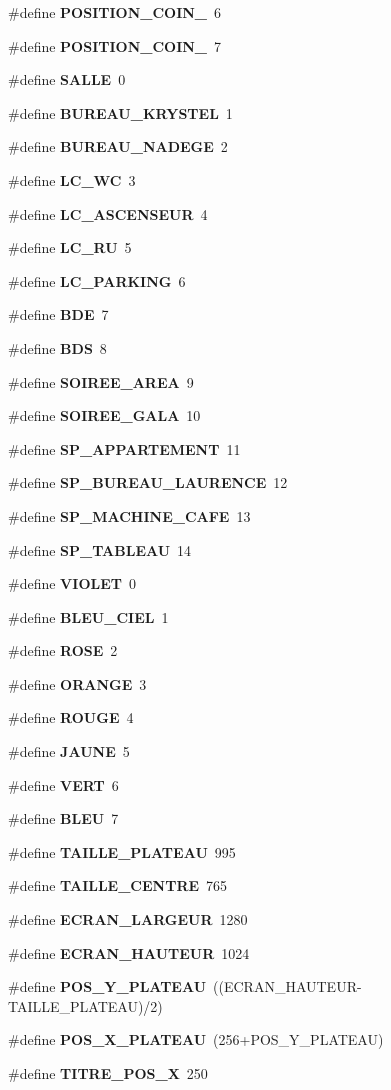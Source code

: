 \begin{CompactItemize}
\item 
\#define {\bf POSITION\_\-COIN\_}~6
\item 
\#define {\bf POSITION\_\-COIN\_}~7
\item 
\#define {\bf SALLE}~0
\item 
\#define {\bf BUREAU\_\-KRYSTEL}~1
\item 
\#define {\bf BUREAU\_\-NADEGE}~2
\item 
\#define {\bf LC\_\-WC}~3
\item 
\#define {\bf LC\_\-ASCENSEUR}~4
\item 
\#define {\bf LC\_\-RU}~5
\item 
\#define {\bf LC\_\-PARKING}~6
\item 
\#define {\bf BDE}~7
\item 
\#define {\bf BDS}~8
\item 
\#define {\bf SOIREE\_\-AREA}~9
\item 
\#define {\bf SOIREE\_\-GALA}~10
\item 
\#define {\bf SP\_\-APPARTEMENT}~11
\item 
\#define {\bf SP\_\-BUREAU\_\-LAURENCE}~12
\item 
\#define {\bf SP\_\-MACHINE\_\-CAFE}~13
\item 
\#define {\bf SP\_\-TABLEAU}~14
\item 
\#define {\bf VIOLET}~0
\item 
\#define {\bf BLEU\_\-CIEL}~1
\item 
\#define {\bf ROSE}~2
\item 
\#define {\bf ORANGE}~3
\item 
\#define {\bf ROUGE}~4
\item 
\#define {\bf JAUNE}~5
\item 
\#define {\bf VERT}~6
\item 
\#define {\bf BLEU}~7
\item 
\#define {\bf TAILLE\_\-PLATEAU}~995
\item 
\#define {\bf TAILLE\_\-CENTRE}~765
\item 
\#define {\bf ECRAN\_\-LARGEUR}~1280
\item 
\#define {\bf ECRAN\_\-HAUTEUR}~1024
\item 
\#define {\bf POS\_\-Y\_\-PLATEAU}~((ECRAN\_\-HAUTEUR-TAILLE\_\-PLATEAU)/2)
\item 
\#define {\bf POS\_\-X\_\-PLATEAU}~(256+POS\_\-Y\_\-PLATEAU)
\item 
\#define {\bf TITRE\_\-POS\_\-X}~250
\item 

\end{CompactItemize}
